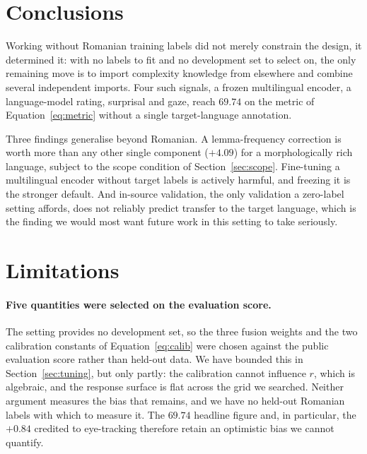 \section{Conclusions}
\label{section:conclusions}

Working without Romanian training labels did not merely constrain the
design, it determined it: with no labels to fit and no development set
to select on, the only remaining move is to import complexity knowledge
from elsewhere and combine several independent imports. Four such
signals, a frozen multilingual encoder, a language-model rating,
surprisal and gaze, reach $69.74$ on the metric of
Equation~\ref{eq:metric} without a single target-language annotation.

Three findings generalise beyond Romanian. A lemma-frequency correction
is worth more than any other single component ($+4.09$) for a
morphologically rich language, subject to the scope condition of
Section~\ref{sec:scope}. Fine-tuning a multilingual encoder without
target labels is actively harmful, and freezing it is the stronger
default. And in-source validation, the only validation a zero-label
setting affords, does not reliably predict transfer to the target
language, which is the finding we would most want future work in this
setting to take seriously.

\section*{Limitations}

\paragraph{Five quantities were selected on the evaluation score.}
The setting provides no development set, so the three fusion weights
and the two calibration constants of Equation~\ref{eq:calib} were
chosen against the public evaluation score rather than held-out data. We
have bounded this in Section~\ref{sec:tuning}, but only partly: the
calibration cannot influence $r$, which is algebraic, and the response
surface is flat across the grid we searched. Neither argument measures
the bias that remains, and we have no held-out Romanian labels with
which to measure it. The $69.74$ headline figure and, in particular, the
$+0.84$ credited to eye-tracking therefore retain an optimistic bias we
cannot quantify.

